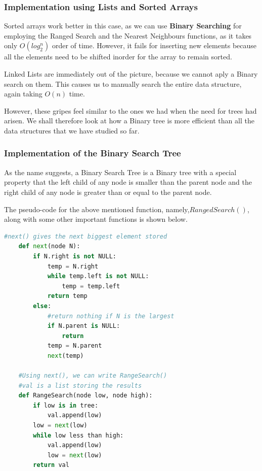 \documentclass{article}
\theoremstyle{definition}
\theoremstyle{example}
\begin{document}
\subsubsection{\Large Implementation using Lists and Sorted Arrays}
\hspace{4mm} Sorted arrays work better in this case, as we can use \textbf{Binary Searching} for employing the Ranged Search and the Nearest Neighbours functions, as it takes only $O(log_2^n)$ order of time. However, it fails for inserting new elements because all the elements need to be shifted inorder for the array to remain sorted.\par
\vspace{4mm}
Linked Lists are immediately out of the picture, because we cannot aply a Binary search on them. This causes us to manually search the entire data structure, again taking $O(n)$ time.\par
\vspace{4mm}
However, these gripes feel similar to the ones we had when the need for trees had arisen. We shall therefore look at how a Binary tree is more efficient than all the data structures that we have studied so far.

\subsubsection{\Large Implementation of the Binary Search Tree}
\hspace{4mm} As the name suggests, a Binary Search Tree is a Binary tree with a special property that the left child of any node is smaller than the parent node and the right child of any node is greater than or equal to the parent node.\par
\vspace{4mm}
The pseudo-code for the above mentioned function, namely,\newline$RangedSearch()$, along with some other important functions is shown below.\par
\vspace{7mm}
\begin{lstlisting}[language = python, basicstyle = \Large]
    #next() gives the next biggest element stored
    def next(node N):
        if N.right is not NULL:
            temp = N.right
            while temp.left is not NULL:
                temp = temp.left
            return temp
        else:
            #return nothing if N is the largest
            if N.parent is NULL:
                return
            temp = N.parent
            next(temp)
    
    #Using next(), we can write RangeSearch()
    #val is a list storing the results
    def RangeSearch(node low, node high):
        if low is in tree:
            val.append(low)
        low = next(low)
        while low less than high:
            val.append(low)
            low = next(low)
        return val
\end{lstlisting}
\end{document}
